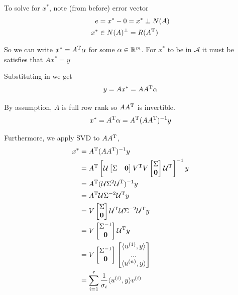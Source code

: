 To solve for $x^*$, note (from before) error vector 
\begin{align*}
e &= x^* - 0 = x^* \perp N(A)\\
x^* &\in N(A)^{\perp} = R(A^{{\rm T}})
\end{align*}

So we can write $x^* = A^{{\rm T}}\alpha$ for some $\alpha \in \mathbb{R}^m$. 
For $x^*$ to be in $\mathcal{A}$ it must be satisfies that $Ax^* = y$

Substituting in we get 
\begin{equation*}
y = Ax^* = AA^{{\rm T}}\alpha
\end{equation*}

By assumption, $A$ is full row rank so $AA^{{\rm T}}$ is invertible.
$$x^* = A^{{\rm T}} \alpha = A^{{\rm T}}(AA^{{\rm T}})^{-1}y$$

Furthermore, we apply SVD to $AA^{{\rm T}}$,
\begin{align*}
x^* &= A^{{\rm T}}(AA^{{\rm T}})^{-1}y\\
&= A^{{\rm T}}\left[\mathcal{U}
\begin{bmatrix}
\Sigma & \mathbf{0}
\end{bmatrix}
V^{{\rm T}}V
\begin{bmatrix}
\Sigma\\
\mathbf{0}
\end{bmatrix}
\mathcal{U}^{{\rm T}}\right]^{-1}y\\
&= A^{{\rm T}}(\mathcal{U}\Sigma^2\mathcal{U}^{{\rm T}})^{-1}y\\
&= A^{{\rm T}}\mathcal{U}\Sigma^{-2}\mathcal{U}^{{\rm T}}y\\
&= V
\begin{bmatrix}
\Sigma\\
\mathbf{0}
\end{bmatrix}
\mathcal{U}^{{\rm T}}\mathcal{U}\Sigma^{-2}\mathcal{U}^{{\rm T}}y\\
&=V
\begin{bmatrix}
\Sigma^{-1} \\
\mathbf{0}
\end{bmatrix}
\mathcal{U}^{{\rm T}}y\\
&= V
\begin{bmatrix}
\Sigma^{-1}\\
\mathbf{0}
\end{bmatrix}
\begin{bmatrix}
\langle u^{(1)}, y\rangle\\
...\\
\langle u^{(n)}, y\rangle
\end{bmatrix}\\
&= \sum^r_{i=1}\frac{1}{\sigma_i}\langle u^{(i)}, y\rangle v^{(i)}
\end{align*}




